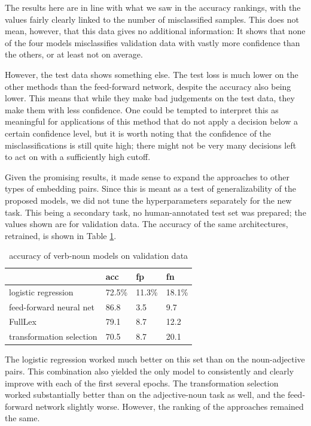 \documentclass[a4paper, 12pt]{article}
\begin{document}
The results here are in line with what we saw in the accuracy rankings, with the values fairly clearly linked to the number of misclassified samples. This does not mean, however, that this data gives no additional information: It shows that none of the four models misclassifies validation data with vastly more confidence than the others, or at least not on average.

However, the test data shows something else. The test loss is much lower on the other methods than the feed-forward network, despite the accuracy also being lower. This means that while they make bad judgements on the test data, they make them with less confidence. One could be tempted to interpret this as meaningful for applications of this method that do not apply a decision below a certain confidence level, but it is worth noting that the confidence of the misclassifications is still quite high; there might not be very many decisions left to act on with a sufficiently high cutoff.

Given the promising results, it made sense to expand the approaches to other types of embedding pairs. Since this is meant as a test of generalizability of the proposed models, we did not tune the hyperparameters separately for the new task. This being a secondary task, no human-annotated test set was prepared; the values shown are for validation data. The accuracy of the same architectures, retrained, is shown in Table \ref{accuracy-vn}.

\begin{table}[]
	\centering
	\begin{tabular}{l|lll}
		                         & acc      & fp       & fn        \\ \hline
		logistic regression      & 72.5\%   & 11.3\%   & 18.1\%    \\
		feed-forward neural net  & 86.8     & 3.5      & 9.7       \\
		FullLex                  & 79.1     & 8.7      & 12.2      \\
		transformation selection & 70.5     & 8.7      & 20.1
	\end{tabular}
	\caption{accuracy of verb-noun models on validation data}
	\label{accuracy-vn}
\end{table}

The logistic regression worked much better on this set than on the noun-adjective pairs. This combination also yielded the only model to consistently and clearly improve with each of the first several epochs. The transformation selection worked substantially better than on the adjective-noun task as well, and the feed-forward network slightly worse. However, the ranking of the approaches remained the same.
\end{document}
